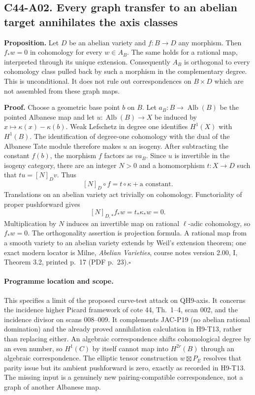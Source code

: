\documentclass[11pt]{article}
\theoremstyle{remark}\newtheorem{remark}[theorem]{Remark}
\begin{document}
\subsection*{C44-A02. Every graph transfer to an abelian target annihilates the axis classes}

\textbf{Proposition.}
Let $D$ be an abelian variety and $f:B\longrightarrow D$ any
morphism. Then $f_*w=0$ in cohomology for every $w\in A_B$.
The same holds for a rational map, interpreted through its unique
extension. Consequently $A_B$ is orthogonal to every cohomology
class pulled back by such a morphism in the complementary degree.
This is unconditional. It does not rule out correspondences on
$B\times D$ which are not assembled from these graph maps.

\textbf{Proof.}
Choose a geometric base point $b$ on $B$. Let
$a_B:B\longrightarrow\operatorname{Alb}(B)$ be the pointed Albanese
map and let $u:\operatorname{Alb}(B)\longrightarrow X$ be induced by
$x\mapsto\kappa(x)-\kappa(b)$.
Weak Lefschetz in degree one identifies $H^1(X)$ with $H^1(B)$.
The identification of degree-one cohomology with the dual of the
Albanese Tate module therefore makes $u$ an isogeny.
After subtracting the constant $f(b)$, the morphism $f$ factors as
$v a_B$. Since $u$ is invertible in the isogeny category, there are
an integer $N>0$ and a homomorphism $t:X\longrightarrow D$ such that
$t u=[N]_D v$. Thus
\[
 [N]_D\circ f=t\circ\kappa+\text{a constant}.
\]
Translations on an abelian variety act trivially on cohomology.
Functoriality of proper pushforward gives
\[
 [N]_{D,*}f_*w=t_*\kappa_*w=0.
\]
Multiplication by $N$ induces an invertible map on rational
$\ell$-adic cohomology, so $f_*w=0$. The orthogonality assertion is
projection formula. A rational map from a smooth variety to an
abelian variety extends by Weil's extension theorem; one exact
modern locator is Milne, \emph{Abelian Varieties}, course notes
version 2.00, I, Theorem 3.2, printed p.~17 (PDF p.~23).\hfill$\square$

\paragraph{Programme location and scope.}
This specifies a limit of the proposed curve-test attack on
QH9-axis. It concerns the incidence higher Picard framework of
cote 44, Th.~1--4, scan 002, and the incidence divisor on scans
008--009. It complements JAC-P19 (no abelian rational domination)
and the already proved annihilation calculation in H9-T13, rather
than replacing either. An algebraic correspondence shifts
cohomological degree by an even number, so $H^1(C)$ by itself
cannot map into $H^{2r}(B)$ through an algebraic correspondence.
The elliptic tensor construction $w\boxtimes P_E$ resolves that
parity issue but its ambient pushforward is zero, exactly as
recorded in H9-T13. The missing input is a genuinely new
pairing-compatible correspondence, not a graph of another
Albanese map.
\end{document}
